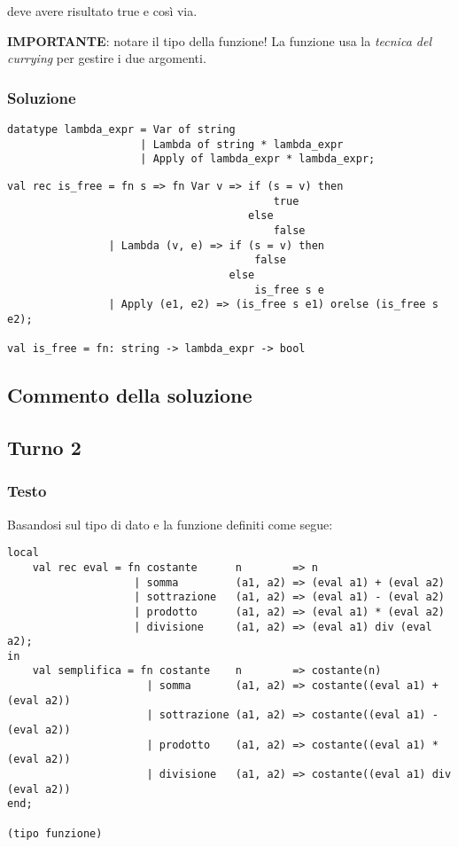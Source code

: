 deve avere risultato true e così via.

\medskip
\textbf{IMPORTANTE}: notare il tipo della funzione! La funzione usa la \emph{tecnica del currying} per gestire i due argomenti.

\subsubsection{Soluzione}

\begin{lstlisting}[style = SML, nolol = true, caption = {Definizione del tipo di dato \sml{espressione Lambda}}]
datatype lambda_expr = Var of string
					 | Lambda of string * lambda_expr
					 | Apply of lambda_expr * lambda_expr;
\end{lstlisting}

\begin{lstlisting}[style = SML, caption = {Definizione della funzione \sml{is\_free}}]
val rec is_free = fn s => fn Var v => if (s = v) then
									      true
									  else
									      false
				| Lambda (v, e) => if (s = v) then
									   false
								   else
									   is_free s e
				| Apply (e1, e2) => (is_free s e1) orelse (is_free s e2);

val is_free = fn: string -> lambda_expr -> bool
\end{lstlisting}

\subsection{Commento della soluzione}

\omissis


\subsection{Turno 2}

\subsubsection{Testo}

Basandosi sul tipo di dato  e la funzione  definiti come segue:
\begin{lstlisting}[style = SML, caption = {Definizione della funzione \sml{semplifica}}]
local
	val rec eval = fn costante		n        => n
					| somma			(a1, a2) => (eval a1) + (eval a2)
					| sottrazione	(a1, a2) => (eval a1) - (eval a2)
					| prodotto		(a1, a2) => (eval a1) * (eval a2)
					| divisione		(a1, a2) => (eval a1) div (eval a2);
in
	val semplifica = fn costante	n        => costante(n)
					  | somma		(a1, a2) => costante((eval a1) + (eval a2))
					  | sottrazione	(a1, a2) => costante((eval a1) - (eval a2))
					  | prodotto	(a1, a2) => costante((eval a1) * (eval a2))
					  | divisione	(a1, a2) => costante((eval a1) div (eval a2))
end;

(tipo funzione)
\end{lstlisting}

